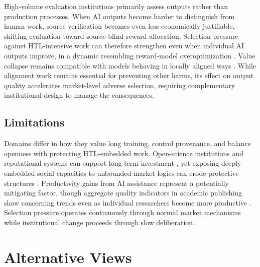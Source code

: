 \documentclass{article}
\theoremstyle{plain}
\theoremstyle{definition}
\theoremstyle{remark}
\begin{document}
High-volume evaluation institutions primarily assess outputs rather than production processes. When AI outputs become harder to distinguish from human work, source verification becomes even less economically justifiable, shifting evaluation toward source-blind reward allocation. Selection pressure against HTL-intensive work can therefore strengthen even when individual AI outputs improve, in a dynamic resembling reward-model overoptimization \citep{gao2023scaling}. Value collapse remains compatible with models behaving in locally aligned ways \citep{kulveit2025gradualdisempowermentsystemicexistential, doi:10.1126/science.adn0117}. While alignment work remains essential for preventing other harms, its effect on output quality accelerates market-level adverse selection, requiring complementary institutional design to manage the consequences.

\subsection{Limitations}
\label{sec:limitations}

Domains differ in how they value long training, control provenance, and balance openness with protecting HTL-embedded work. Open-science institutions and reputational systems can support long-term investment \citep{PARTHA1994487}, yet exposing deeply embedded social capacities to unbounded market logics can erode protective structures \citep{polanyi1944greattransformation}. Productivity gains from AI assistance \citep{doi:10.1126/science.adh2586, DellAcqua2023NavigatingTJ, Chen_2025, doi:10.1126/science.adj0998, Chatterji2025How} represent a potentially mitigating factor, though aggregate quality indicators in academic publishing show concerning trends even as individual researchers become more productive \citep{suchak-etal-2025-explosion, maupin-etal-2025-dramatic}. Selection pressure operates continuously through normal market mechanisms while institutional change proceeds through slow deliberation.

\section{Alternative Views}
\label{sec:alternative-views}
\end{document}
